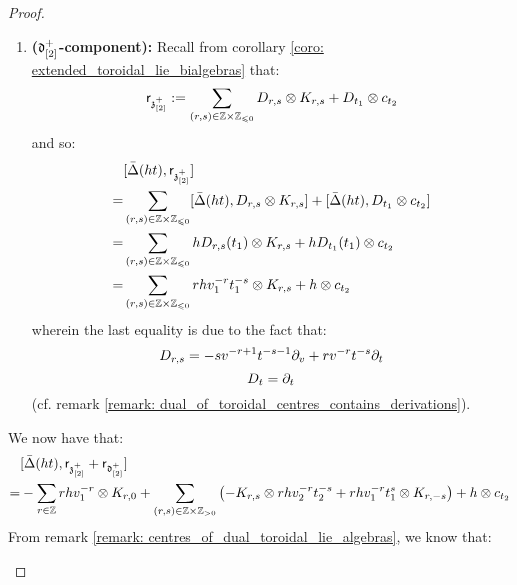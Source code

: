 \begin{proof}
\begin{enumerate}
\begin{enumerate}
                            \item \textbf{($\mathfrak{d}_{[2]}^+$-component):} Recall from corollary \ref{coro: extended_toroidal_lie_bialgebras} that:
                                $$\sfr_{\z_{[2]}^+} := \sum_{(r, s) \in \Z \x \Z_{\leq 0}} D_{r, s} \tensor K_{r, s} + D_{t_1} \tensor c_{t_2}$$
                            and so:
                                $$
                                    \begin{aligned}
                                        & [\bar{\Delta}(ht), \sfr_{\z_{[2]}^+}]
                                        \\
                                        = & \sum_{(r, s) \in \Z \x \Z_{\leq 0}} [\bar{\Delta}(ht), D_{r, s} \tensor K_{r, s}] + [\bar{\Delta}(ht), D_{t_1} \tensor c_{t_2}]
                                        \\
                                        = & \sum_{(r, s) \in \Z \x \Z_{\leq 0}} h D_{r, s}(t_1) \tensor K_{r, s} + h D_{t_1}(t_1) \tensor c_{t_2}
                                        \\
                                        = & \sum_{(r, s) \in \Z \x \Z_{\leq 0}} r h v_1^{-r} t_1^{-s} \tensor K_{r, s} + h \tensor c_{t_2}
                                    \end{aligned}
                                $$
                            wherein the last equality is due to the fact that:
                                $$D_{r, s} = -s v^{-r + 1} t^{-s - 1} \partial_v + r v^{-r} t^{-s} \partial_t$$
                                $$D_t = \partial_t$$
                            (cf. remark \ref{remark: dual_of_toroidal_centres_contains_derivations}). 
                        \end{enumerate}
                        We now have that:
                            $$
                                \begin{aligned}
                                    & [\bar{\Delta}(ht), \sfr_{\z_{[2]}^+} + \sfr_{\d_{[2]}^+}]
                                    \\
                                    = & -\sum_{r \in \Z} r h v_1^{-r} \tensor K_{r, 0} + \sum_{(r, s) \in \Z \x \Z_{> 0}} \left( -K_{r, s} \tensor r h v_2^{-r} t_2^{-s} + r h v_1^{-r} t_1^s \tensor K_{r, -s} \right) + h \tensor c_{t_2}
                                \end{aligned}
                            $$
                        From remark \ref{remark: centres_of_dual_toroidal_lie_algebras}, we know that:

\end{enumerate}
\end{proof}
